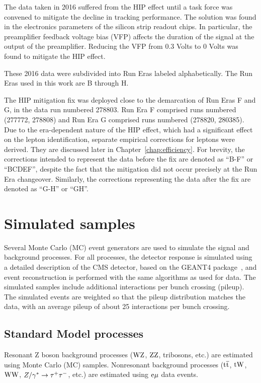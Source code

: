 The data taken in 2016 suffered from the HIP effect until a task force was
convened to mitigate the decline in tracking performance.
The solution was found in the electronics parameters of the silicon strip readout chips.
In particular, the preamplifier feedback voltage bias (VFP) affects the duration
of the signal at the output of the preamplifier.
Reducing the VFP from 0.3 Volts to 0 Volts was found to mitigate the HIP effect. 

These 2016 data were subdivided into Run Eras labeled alphabetically.
The Run Eras used in this work are B through H. 

The HIP mitigation fix was deployed close to the demarcation of Run Eras F and G,
in the data run numbered 278803.
Run Era F comprised runs numbered (277772, 278808) and Run Era G comprised runs numbered (278820, 280385).
Due to the era-dependent nature of the HIP effect, which had a significant effect on the lepton identification, 
separate empirical corrections for leptons were derived.
They are discussed later in Chapter~\ref{chap:efficiency}.
For brevity, the corrections intended to represent the data before the fix are denoted as
``B-F'' or ``BCDEF'', despite the fact that the mitigation did not occur precisely at the Run Era changeover.
Similarly, the corrections representing the data after the fix are denoted as ``G-H'' or ``GH''.

\section{Simulated samples}
\label{sec:mcsamples}
Several Monte Carlo (MC) event generators are used to simulate the signal and
background processes. For all processes, the detector response is simulated using a detailed
description of the CMS detector, based on the \textsc{GEANT4} 
package~\cite{Agostinelli:2002hh}, and event reconstruction is performed with
the same algorithms as used for data.
The simulated samples include additional interactions per bunch crossing (pileup).
The simulated events are weighted so that the pileup distribution matches the data,
with an average pileup of about 25 interactions per bunch crossing.

\subsection{Standard Model processes}
Resonant Z boson background processes ($\mathrm{W}\mathrm{Z}$, $\mathrm{Z}\mathrm{Z}$, tribosons, etc.) are
estimated using Monte Carlo (MC) samples. Nonresonant background processes
(${\mathrm{t}\overline{\mathrm{t}}}$, $\mathrm{tW}$, $\mathrm{W}\mathrm{W}$, $Z/\gamma^*\to\tau^+\tau^-$, etc.) are estimated using $\mathrm{e}\mu$ data events.

